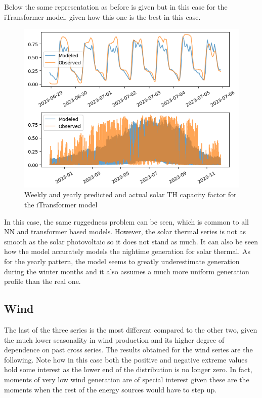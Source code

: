 Below the same representation as before is given but in this case for the iTransformer model, given how this one is the best in this case.
\begin{figure}[ht]
    \centering
    \captionsetup{justification=centering}
    \includegraphics[width=0.7\linewidth]{assets/itransformer-solar-th.png}
    \caption{Weekly and yearly predicted and actual solar TH capacity factor for the iTransformer model}
    \label{fig:itransformer-solar-th}
\end{figure}
In this case, the same ruggedness problem can be seen, which is common to all NN and transformer based models. However, the solar thermal series is not as smooth as the solar photovoltaic so it does not stand as much. It can also be seen how the model accurately models the nightime generation for solar thermal. 
As for the yearly pattern, the model seems to greatly underestimate generation during the winter months and it also assumes a much more uniform generation profile than the real one. 
\subsection{Wind}
The last of the three series is the most different compared to the other two, given the much lower seasonality in wind production and its higher degree of dependence on past cross series. The results obtained for the wind series are the following. Note how in this case both the positive and negative extreme values hold some interest as the lower end of the distribution is no longer zero. In fact, moments of very low wind generation are of special interest given these are the moments when the rest of the energy sources would have to step up.  

